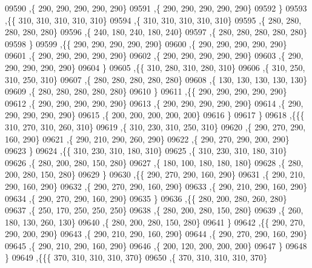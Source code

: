 \begin{DoxyCode}
09590     ,\{   290,   290,   290,   290,   290\}
09591     ,\{   290,   290,   290,   290,   290\}
09592     \}
09593    ,\{\{   310,   310,   310,   310,   310\}
09594     ,\{   310,   310,   310,   310,   310\}
09595     ,\{   280,   280,   280,   280,   280\}
09596     ,\{   240,   180,   240,   180,   240\}
09597     ,\{   280,   280,   280,   280,   280\}
09598     \}
09599    ,\{\{   290,   290,   290,   290,   290\}
09600     ,\{   290,   290,   290,   290,   290\}
09601     ,\{   290,   290,   290,   290,   290\}
09602     ,\{   290,   290,   290,   290,   290\}
09603     ,\{   290,   290,   290,   290,   290\}
09604     \}
09605    ,\{\{   310,   280,   310,   280,   310\}
09606     ,\{   310,   250,   310,   250,   310\}
09607     ,\{   280,   280,   280,   280,   280\}
09608     ,\{   130,   130,   130,   130,   130\}
09609     ,\{   280,   280,   280,   280,   280\}
09610     \}
09611    ,\{\{   290,   290,   290,   290,   290\}
09612     ,\{   290,   290,   290,   290,   290\}
09613     ,\{   290,   290,   290,   290,   290\}
09614     ,\{   290,   290,   290,   290,   290\}
09615     ,\{   200,   200,   200,   200,   200\}
09616     \}
09617    \}
09618   ,\{\{\{   310,   270,   310,   260,   310\}
09619     ,\{   310,   230,   310,   250,   310\}
09620     ,\{   290,   270,   290,   160,   290\}
09621     ,\{   290,   210,   290,   260,   290\}
09622     ,\{   290,   270,   290,   200,   290\}
09623     \}
09624    ,\{\{   310,   230,   310,   180,   310\}
09625     ,\{   310,   230,   310,   180,   310\}
09626     ,\{   280,   200,   280,   150,   280\}
09627     ,\{   180,   100,   180,   180,   180\}
09628     ,\{   280,   200,   280,   150,   280\}
09629     \}
09630    ,\{\{   290,   270,   290,   160,   290\}
09631     ,\{   290,   210,   290,   160,   290\}
09632     ,\{   290,   270,   290,   160,   290\}
09633     ,\{   290,   210,   290,   160,   290\}
09634     ,\{   290,   270,   290,   160,   290\}
09635     \}
09636    ,\{\{   280,   200,   280,   260,   280\}
09637     ,\{   250,   170,   250,   250,   250\}
09638     ,\{   280,   200,   280,   150,   280\}
09639     ,\{   260,   180,   130,   260,   130\}
09640     ,\{   280,   200,   280,   150,   280\}
09641     \}
09642    ,\{\{   290,   270,   290,   200,   290\}
09643     ,\{   290,   210,   290,   160,   290\}
09644     ,\{   290,   270,   290,   160,   290\}
09645     ,\{   290,   210,   290,   160,   290\}
09646     ,\{   200,   120,   200,   200,   200\}
09647     \}
09648    \}
09649   ,\{\{\{   370,   310,   310,   310,   370\}
09650     ,\{   370,   310,   310,   310,   370\}

\end{DoxyCode}
